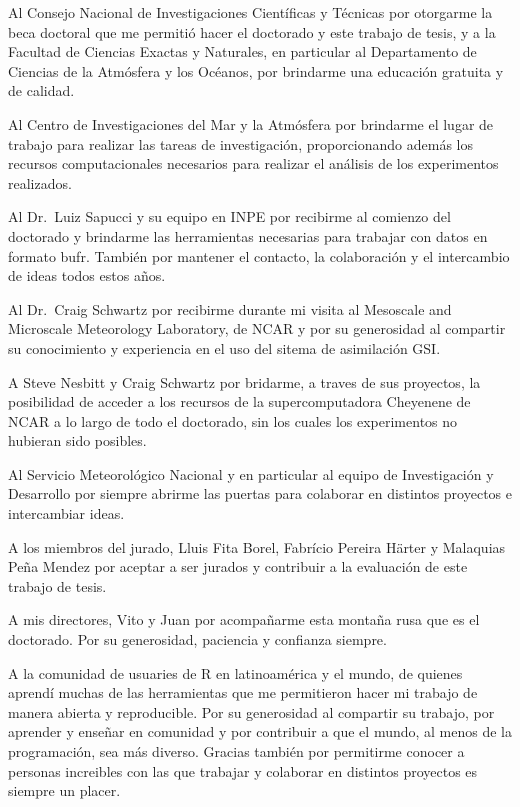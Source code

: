 \documentclass[12pt,oneside,a4paper]{reedthesis}
\begin{document}
  \begin{acknowledgements}
    Al Consejo Nacional de Investigaciones Científicas y Técnicas por otorgarme la beca doctoral que me permitió hacer el doctorado y este trabajo de tesis, y a la Facultad de Ciencias Exactas y Naturales, en particular al Departamento de Ciencias de la Atmósfera y los Océanos, por brindarme una educación gratuita y de calidad.
    
    Al Centro de Investigaciones del Mar y la Atmósfera por brindarme el lugar de trabajo para realizar las tareas de investigación, proporcionando además los recursos computacionales necesarios para realizar el análisis de los experimentos realizados.
    
    Al Dr.~Luiz Sapucci y su equipo en INPE por recibirme al comienzo del doctorado y brindarme las herramientas necesarias para trabajar con datos en formato bufr. También por mantener el contacto, la colaboración y el intercambio de ideas todos estos años.
    
    Al Dr.~Craig Schwartz por recibirme durante mi visita al Mesoscale and Microscale Meteorology Laboratory, de NCAR y por su generosidad al compartir su conocimiento y experiencia en el uso del sitema de asimilación GSI.
    
    A Steve Nesbitt y Craig Schwartz por bridarme, a traves de sus proyectos, la posibilidad de acceder a los recursos de la supercomputadora Cheyenene de NCAR a lo largo de todo el doctorado, sin los cuales los experimentos no hubieran sido posibles.
    
    Al Servicio Meteorológico Nacional y en particular al equipo de Investigación y Desarrollo por siempre abrirme las puertas para colaborar en distintos proyectos e intercambiar ideas.
    
    A los miembros del jurado, Lluis Fita Borel, Fabrício Pereira Härter y Malaquias Peña Mendez por aceptar a ser jurados y contribuir a la evaluación de este trabajo de tesis.
    
    A mis directores, Vito y Juan por acompañarme esta montaña rusa que es el doctorado. Por su generosidad, paciencia y confianza siempre.
    
    A la comunidad de usuaries de R en latinoamérica y el mundo, de quienes aprendí muchas de las herramientas que me permitieron hacer mi trabajo de manera abierta y reproducible. Por su generosidad al compartir su trabajo, por aprender y enseñar en comunidad y por contribuir a que el mundo, al menos de la programación, sea más diverso. Gracias también por permitirme conocer a personas increibles con las que trabajar y colaborar en distintos proyectos es siempre un placer.
    

\end{acknowledgements}
\end{document}
